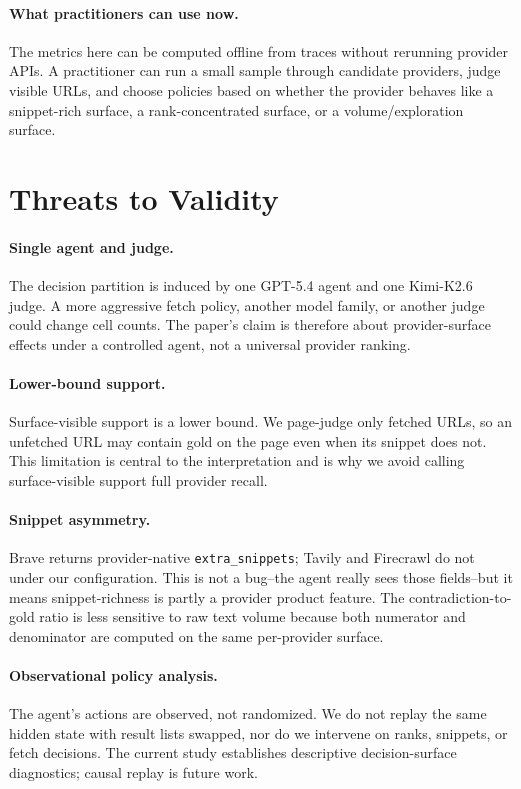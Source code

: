 \paragraph{What practitioners can use now.}
The metrics here can be computed offline from traces without rerunning provider APIs. A practitioner can run a small sample through candidate providers, judge visible URLs, and choose policies based on whether the provider behaves like a snippet-rich surface, a rank-concentrated surface, or a volume/exploration surface.

\section{Threats to Validity}
\label{sec:limitations}

\paragraph{Single agent and judge.}
The decision partition is induced by one GPT-5.4 agent and one Kimi-K2.6 judge. A more aggressive fetch policy, another model family, or another judge could change cell counts. The paper's claim is therefore about provider-surface effects under a controlled agent, not a universal provider ranking.

\paragraph{Lower-bound support.}
Surface-visible support is a lower bound. We page-judge only fetched URLs, so an unfetched URL may contain gold on the page even when its snippet does not. This limitation is central to the interpretation and is why we avoid calling surface-visible support full provider recall.

\paragraph{Snippet asymmetry.}
Brave returns provider-native \texttt{extra\_snippets}; Tavily and Firecrawl do not under our configuration. This is not a bug--the agent really sees those fields--but it means snippet-richness is partly a provider product feature. The contradiction-to-gold ratio is less sensitive to raw text volume because both numerator and denominator are computed on the same per-provider surface.

\paragraph{Observational policy analysis.}
The agent's actions are observed, not randomized. We do not replay the same hidden state with result lists swapped, nor do we intervene on ranks, snippets, or fetch decisions. The current study establishes descriptive decision-surface diagnostics; causal replay is future work.

